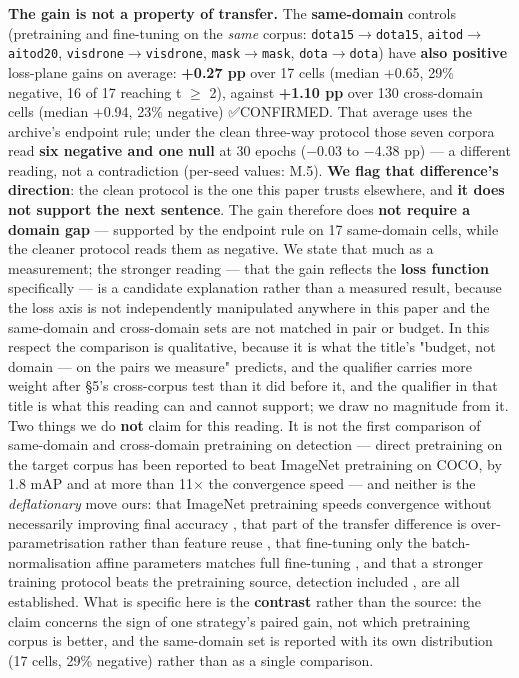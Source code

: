 \documentclass[pdflatex,sn-mathphys-ay]{sn-jnl}
\begin{document}
\textbf{The gain is not a property of transfer.} The \textbf{same-domain} controls (pretraining and fine-tuning on the \emph{same} corpus: \texttt{dota15\ensuremath{\rightarrow}dota15}, \texttt{aitod\ensuremath{\rightarrow}aitod20}, \texttt{visdrone\ensuremath{\rightarrow}visdrone}, \texttt{mask\ensuremath{\rightarrow}mask}, \texttt{dota\ensuremath{\rightarrow}dota}) have \textbf{also positive} loss-plane gains on average: \textbf{+0.27 pp} over 17 cells (median +0.65, 29\% negative, 16 of 17 reaching \textbar{}t\textbar{} \ensuremath{\geq} 2), against \textbf{+1.10 pp} over 130 cross-domain cells (median +0.94, 23\% negative) ✅CONFIRMED. That average uses the archive's endpoint rule; under the clean three-way protocol those seven corpora read \textbf{six negative and one null} at 30 epochs (\ensuremath{-}0.03 to \ensuremath{-}4.38 pp) --- a different reading, not a contradiction (per-seed values: M.5). \textbf{We flag that difference's direction}: the clean protocol is the one this paper trusts elsewhere, and \textbf{it does not support the next sentence}. The gain therefore does \textbf{not require a domain gap} --- supported by the endpoint rule on 17 same-domain cells, while the cleaner protocol reads them as negative. We state that much as a measurement; the stronger reading --- that the gain reflects the \textbf{loss function} specifically --- is a candidate explanation rather than a measured result, because the loss axis is not independently manipulated anywhere in this paper and the same-domain and cross-domain sets are not matched in pair or budget. In this respect the comparison is qualitative, because it is what the title's "budget, not domain --- on the pairs we measure" predicts, and the qualifier carries more weight after \S{}5's cross-corpus test than it did before it, and the qualifier in that title is what this reading can and cannot support; we draw no magnitude from it. Two things we do \textbf{not} claim for this reading. It is not the first comparison of same-domain and cross-domain pretraining on detection --- direct pretraining on the target corpus has been reported to beat ImageNet pretraining on COCO, by 1.8 mAP and at more than 11\ensuremath{\times} the convergence speed \citep{li2021} --- and neither is the \emph{deflationary} move ours: that ImageNet pretraining speeds convergence without necessarily improving final accuracy \citep{he2019}, that part of the transfer difference is over-parametrisation rather than feature reuse \citep{raghu2019}, that fine-tuning only the batch-normalisation affine parameters matches full fine-tuning \citep{kanavati2021}, and that a stronger training protocol beats the pretraining source, detection included \citep{pototzky2022}, are all established. What is specific here is the \textbf{contrast} rather than the source: the claim concerns the sign of one strategy's paired gain, not which pretraining corpus is better, and the same-domain set is reported with its own distribution (17 cells, 29\% negative) rather than as a single comparison.
\end{document}
